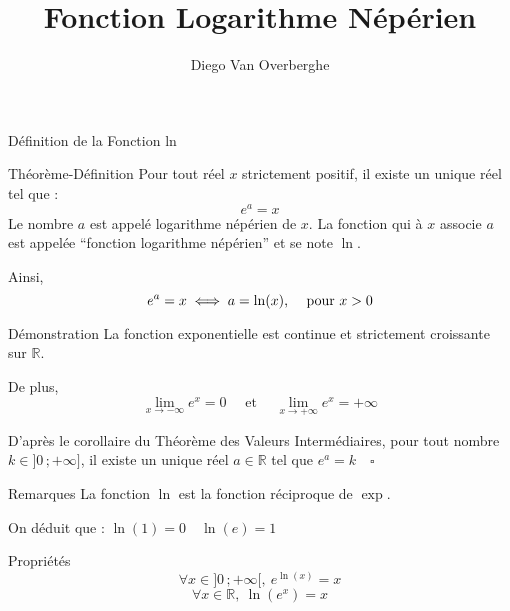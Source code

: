 \documentclass{cours}
\title{Fonction Logarithme Népérien}
\author{Diego Van Overberghe}
\begin{document}

    \begin{Gpartie}{Définition de la Fonction ln}
        \begin{Spartie}{Théorème-Définition}
            Pour tout réel $x$ strictement positif, il existe un unique réel tel que :
            \[e^a=x\]
            Le nombre $a$ est appelé logarithme népérien de $x$. La fonction qui à $x$ associe $a$ est appelée ``fonction logarithme népérien'' et se note $\ln$.

            Ainsi,
            \[e^a=x\iff a=\ln(x)\text{, \quad pour $x>0$}\]
        \end{Spartie}
        \begin{Spartie}{Démonstration}
            La fonction exponentielle est continue et strictement croissante sur $\mathbb{R}$.

            De plus, 
            \[\lim_{x\to -\infty} e^x=0\quad\text{ et }\quad\lim_{x\to +\infty} e^x=+\infty\]

            D'après le corollaire du Théorème des Valeurs Intermédiaires, pour tout nombre $k\in\big]0\,;+\infty\big]$, il existe un unique réel $a\in\mathbb{R}$ tel que $e^a=k\quad\square$
        \end{Spartie}
        \begin{Spartie}{Remarques}
            La fonction $\ln$ est la fonction réciproque de $\exp$.

            On déduit que : $\ln(1)=0\quad\ln(e)=1$
        \end{Spartie}
        \begin{Spartie}{Propriétés}
            \[\forall x\in\big]0\,;+\infty\big[,\ e^{\ln(x)}=x\]
            \[\forall x\in\mathbb{R},\ \ln\left(e^x\right)=x\]
        \end{Spartie}
    \end{Gpartie}
    \pagebreak
\end{document}
